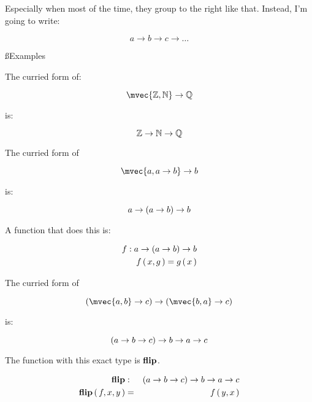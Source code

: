Especially when most of the time, they group to the right like that. Instead,
I'm going to write:

\begin{equation}
    a \to b \to c \to \dots
\end{equation}

\ss{Examples}

\begin{example}
    The curried form of:

    \begin{equation}
        \mvec{\Z,\N} \to \Q
    \end{equation}

    is:

    \begin{equation}
        \mathbb{Z} \to \mathbb{N} \to \mathbb{Q}
    \end{equation}
\end{example}

\begin{example}
    The curried form of

    \begin{equation}
        \mvec{a, a \to b} \to b
    \end{equation}

    is:

    \begin{equation}
        a \to \left( a \to b \right) \to b
    \end{equation}

    A function that does this is:

    \begin{eqnarray}
        f : a \to \left( a \to b \right) \to b \\
        f \left(\, x,g \,\right) = g \left(\, x \,\right)
    \end{eqnarray}
\end{example}


\begin{example}
    \label{exp:flip}
    The curried form of

    \begin{equation}
        \parens{\mvec{a, b} \to c} \to \parens{\mvec{b,a} \to c}
    \end{equation}

    is:

    \begin{equation}
        \left( a \to b \to c \right) \to b \to a \to c
    \end{equation}

    The function with this exact type is $\mathbf{flip}$.

    \begin{eqnarray}
        \mathbf{flip} & : & \left( a \to b \to c \right) \to b \to a \to c \\
        \mathbf{flip} \left(\, f,x,y \,\right) & = & f \left(\, y,x \,\right) \\
    \end{eqnarray}
\end{example}

